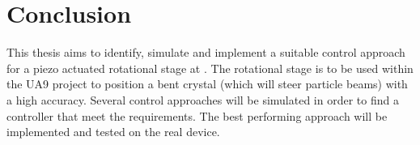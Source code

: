 \chapter{Conclusion}\label{cha:conclusion}

This thesis aims to identify, simulate and implement a suitable control approach for a piezo actuated rotational stage at \abbrCERN. The rotational stage is to be used within the UA9 project to position a bent crystal (which will steer particle beams) with a high accuracy. Several control approaches will be simulated in order to find a controller that meet the requirements. The best performing approach will be implemented and tested on the real device. 
